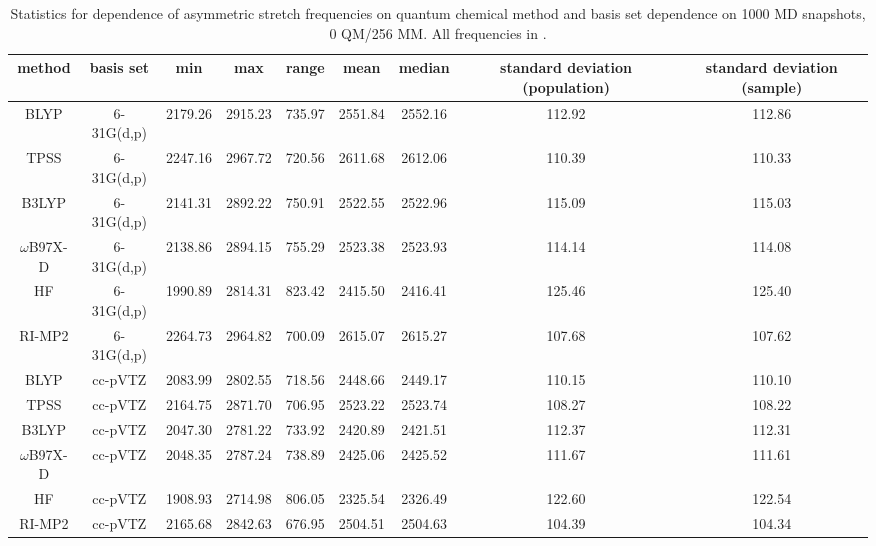 \begin{landscape}
  \begin{table}
    \centering
    \caption[Statistical distribution of harmonic frequencies for MD snapshots]{Statistics for dependence of  asymmetric stretch frequencies on quantum chemical method and basis set dependence on \num{1000} MD snapshots, 0 QM/256 MM. All frequencies in \si{\wavenumber}.}
    \label{paper_02:tab:S1}
    \begin{tabular}{ccccccccc}
      \toprule
      method & basis set & min & max & range & mean & median & standard deviation (population) & standard deviation (sample) \\
      \midrule
      BLYP & 6-31G(d,p) & 2179.26 & 2915.23 & 735.97 & 2551.84 & 2552.16 & 112.92 & 112.86 \\
      TPSS & 6-31G(d,p) & 2247.16 & 2967.72 & 720.56 & 2611.68 & 2612.06 & 110.39 & 110.33 \\
      B3LYP & 6-31G(d,p) & 2141.31 & 2892.22 & 750.91 & 2522.55 & 2522.96 & 115.09 & 115.03 \\
      \(\omega\)B97X-D & 6-31G(d,p) & 2138.86 & 2894.15 & 755.29 & 2523.38 & 2523.93 & 114.14 & 114.08 \\
      HF & 6-31G(d,p) & 1990.89 & 2814.31 & 823.42 & 2415.50 & 2416.41 & 125.46 & 125.40 \\
      RI-MP2 & 6-31G(d,p) & 2264.73 & 2964.82 & 700.09 & 2615.07 & 2615.27 & 107.68 & 107.62 \\
      BLYP & cc-pVTZ & 2083.99 & 2802.55 & 718.56 & 2448.66 & 2449.17 & 110.15 & 110.10 \\
      TPSS & cc-pVTZ & 2164.75 & 2871.70 & 706.95 & 2523.22 & 2523.74 & 108.27 & 108.22 \\
      B3LYP & cc-pVTZ & 2047.30 & 2781.22 & 733.92 & 2420.89 & 2421.51 & 112.37 & 112.31 \\
      \(\omega\)B97X-D & cc-pVTZ & 2048.35 & 2787.24 & 738.89 & 2425.06 & 2425.52 & 111.67 & 111.61 \\
      HF & cc-pVTZ & 1908.93 & 2714.98 & 806.05 & 2325.54 & 2326.49 & 122.60 & 122.54 \\
      RI-MP2 & cc-pVTZ & 2165.68 & 2842.63 & 676.95 & 2504.51 & 2504.63 & 104.39 & 104.34 \\
      \bottomrule
    \end{tabular}
  \end{table}
\end{landscape}

